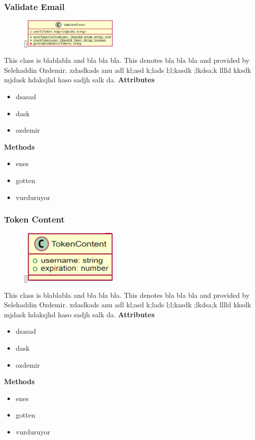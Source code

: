 \subsubsection{Validate Email}
\begin{figure}
    \raisebox{0pt}[\dimexpr{}\baselineskip\relax]{\includegraphics[width=4.5cm]{classes/auth/3.png}}
\end{figure} 
\par
This class is blablabla and bla bla bla. This denotes bla bla bla and provided by Selehaddin Ozdemir. xdaslkads anu adl kl;asd k;lads l;l;kasdk ;lkdsa;k lllld kksdk mjdask hdaksjhd haso sadjh salk da.
\newline
\newline
\textbf{Attributes}
\begin{itemize}
    \item dsasad
    \item dask
    \item ozdemir
\end{itemize}
\textbf{Methods}
\begin{itemize}
    \item enes
    \item gotten
    \item vurduruyor
\end{itemize}

\subsubsection{Token Content}
\begin{figure}
    \raisebox{0pt}[\dimexpr{}\baselineskip\relax]{\includegraphics[width=4.5cm]{classes/auth/4.png}}
\end{figure} 
\par
This class is blablabla and bla bla bla. This denotes bla bla bla and provided by Selehaddin Ozdemir. xdaslkads anu adl kl;asd k;lads l;l;kasdk ;lkdsa;k lllld kksdk mjdask hdaksjhd haso sadjh salk da.
\newline
\newline
\textbf{Attributes}
\begin{itemize}
    \item dsasad
    \item dask
    \item ozdemir
\end{itemize}
\textbf{Methods}
\begin{itemize}
    \item enes
    \item gotten
    \item vurduruyor
\end{itemize}

